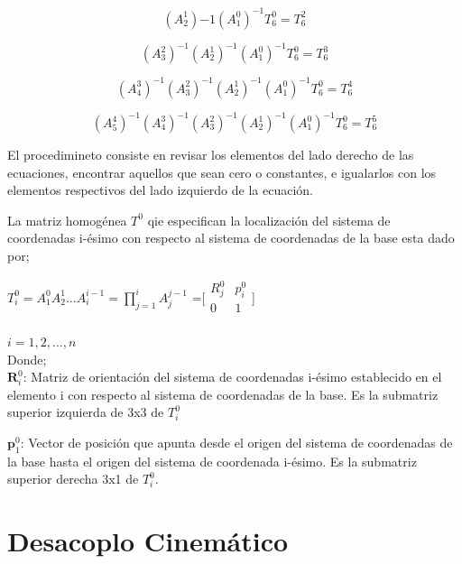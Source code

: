 \documentclass[letter,openright,12pt,spanish]{report}
\begin{document}
\begin{displaymath}
(A^1_2){-1}(A^0_1)^{-1}T^0_6=T^2_6
\end{displaymath}

\begin{displaymath}
(A^2_3)^{-1}(A^1_2)^{-1}(A^0_1)^{-1}T^0_6=T^3_6
\end{displaymath}

\begin{displaymath}
(A^3_4)^{-1}(A^2_3)^{-1}(A^1_2)^{-1}(A^0_1)^{-1}T^0_6=T^4_6
\end{displaymath}

\begin{displaymath}
(A^4_5)^{-1}(A^3_4)^{-1}(A^2_3)^{-1}(A^1_2)^{-1}(A^0_1)^{-1}T^0_6=T^5_6
\end{displaymath}

El procedimineto consiste en revisar los elementos del lado derecho de las ecuaciones, encontrar aquellos que sean cero o constantes, e igualarlos con los elementos respectivos del lado izquierdo de la ecuaci\'on.

La matriz homog\'enea $T^0$ qie especifican la localizaci\'on del sistema de coordenadas i-\'esimo con respecto al sistema de coordenadas de la base esta dado por;

\begin{center}
$T^0_i=A^0_1A^1_2...A^{i-1}_i= \prod^i_{j=1}A_j^{j-1}$ =[$\begin{matrix}
	R^0_j & p^0_i\\
	0 & 1\\
\end{matrix}$]
\end{center}

$i=1,2,...,n$\\

Donde;\\

$\textbf{R}^0_i$:  Matriz de orientaci\'on del sistema de coordenadas i-\'esimo establecido en el elemento i con respecto al sistema de coordenadas de la base. Es la submatriz superior izquierda de 3x3 de $T^0_i$

$\textbf{p}^0_1$: Vector de posici\'on que apunta desde el origen del sistema de coordenadas de la base hasta el origen del sistema de coordenada i-\'esimo. Es la submatriz superior derecha 3x1 de $T^0_i$.

\section{Desacoplo Cinem\'atico}
\end{document}
